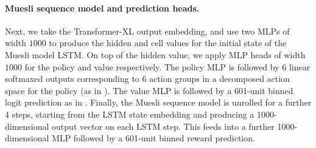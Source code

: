 \paragraph{Muesli sequence model and prediction heads.} 
Next, we take the Transformer-XL output embedding, and use two MLPs of width $1000$ to produce the hidden and cell values for the initial state of the Muesli model LSTM. On top of the hidden value, we apply MLP heads of width $1000$ for the policy and value respectively. The policy MLP is followed by 6 linear softmaxed outputs corresponding to 6 action groups in a decomposed action space for the policy (as in \citet{xland}). The value MLP is followed by a 601-unit binned logit prediction as in \citet{hessel2021muesli}. Finally, the Muesli sequence model is unrolled for a further 4 steps, starting from the LSTM state embedding and producing a 1000-dimensional output vector on each LSTM step. This feeds into a further 1000-dimensional MLP followed by a 601-unit binned reward prediction. 
